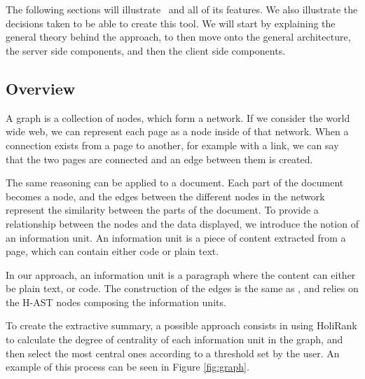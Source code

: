 \section{\projectName}\label{sec:projectDesign}
The following sections will illustrate \projectName~and all of its features. We also illustrate the decisions taken to be able to create this tool. We will start by explaining the general theory behind the approach, to then move onto the general architecture, the server side components, and then the client side components. 

\subsection{Overview}

A graph is a collection of nodes, which form a network. If we consider the world wide web, we can represent each page as a node inside of that network. When a connection exists from a page to another, for example with a link, we can say that the two pages are connected and an edge between them is created. 

The same reasoning can be applied to a document. Each part of the document becomes a node, and the edges between the different nodes in the network represent the similarity between the parts of the document. To provide a relationship between the nodes and the data displayed, we introduce the notion of an information unit. An information unit is a piece of content extracted from a page, which can contain either code or plain text.

In our approach, an information unit is a paragraph where the content can either be plain text, or code. The construction of the edges is the same as \cite{Ponz2015b}, and relies on the H-AST nodes composing the information units.  

To create the extractive summary, a possible approach consists in using HoliRank to calculate the degree of centrality of each information unit in the graph, and then select the most central ones according to a threshold set by the user. An example of this process can be seen in Figure \ref{fig:graph}.

